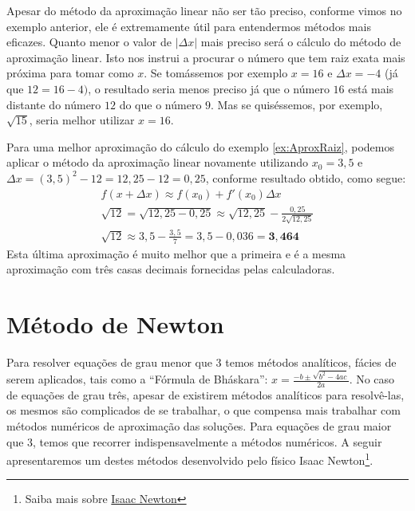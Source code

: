 \cleardoublepage\documentclass[../main.tex]{subfiles}
\begin{document}
\begin{obs}
 Apesar do método da aproximação linear não ser tão preciso, conforme vimos no exemplo anterior, ele é extremamente útil para entendermos métodos mais eficazes. Quanto menor o valor de $|\Delta x|$ mais preciso será o cálculo do método de aproximação linear. Isto nos instrui a procurar o número que tem raiz exata mais próxima para tomar como $x$. Se tomássemos por exemplo $x=16$ e $\Delta x=-4$ (já que $12=16-4)$, o resultado seria menos preciso já que o número $16$ está mais distante do número $12$ do que o número $9$. Mas se quiséssemos, por exemplo, $\sqrt{15}$, seria melhor utilizar $x=16$.
\end{obs}
\begin{obs}
 Para uma melhor aproximação do cálculo do exemplo \ref{ex:AproxRaiz}, podemos aplicar o método da aproximação linear novamente utilizando $x_0=3,5$ e $\Delta x=(3,5)^2-12=12,25-12=0,25$, conforme resultado  obtido, como segue:
 \begin{align*}
    f(x+\Delta x)\approx f(x_0)+f'(x_0)\Delta x\\
    \sqrt{12}=\sqrt{12,25-0,25}\approx \sqrt{12,25}- \frac{0,25}{2\sqrt{12,25}}\\
    \sqrt{12}\approx 3,5-\frac{3,5}{7}=3,5-0,036=\pmb{3,464}
    \end{align*}
    Esta última aproximação é muito melhor que a primeira e é a mesma aproximação com três casas decimais fornecidas pelas calculadoras.
\end{obs}
\section{Método de Newton}
  Para resolver equações de grau menor que 3 temos métodos analíticos, fácies de serem aplicados, tais como a ``Fórmula de Bháskara'':  $x=\frac{-b\pm\sqrt{b^2-4ac}}{2a}$. No caso de equações de grau três, apesar de existirem métodos analíticos para resolvê-las, os mesmos são complicados de se trabalhar, o que compensa mais trabalhar com métodos numéricos de aproximação das soluções. Para equações de grau maior que 3, temos que recorrer indispensavelmente a métodos numéricos. A seguir apresentaremos um destes métodos desenvolvido pelo físico Isaac Newton\footnote{Saiba mais sobre \href{https://pt.wikipedia.org/wiki/Isaac_Newton}{Isaac Newton}}.
\end{document}
